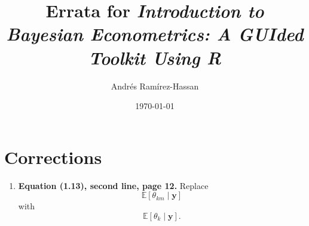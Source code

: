 \documentclass[12pt]{article}
\title{Errata for \textit{Introduction to Bayesian Econometrics: A GUIded Toolkit Using R}}
\author{Andrés Ramírez-Hassan}
\date{\today}
\begin{document}
\maketitle

\section*{Corrections}

\begin{enumerate}[leftmargin=*]

    \item \textbf{Equation (1.13), second line, page 12.} Replace
    \[
    \mathbb{E}[\theta_{km}\mid\mathbf{y}]
    \]
    with
    \[
    \mathbb{E}[\theta_k\mid\mathbf{y}].
    \]

\end{enumerate}
\end{document}

